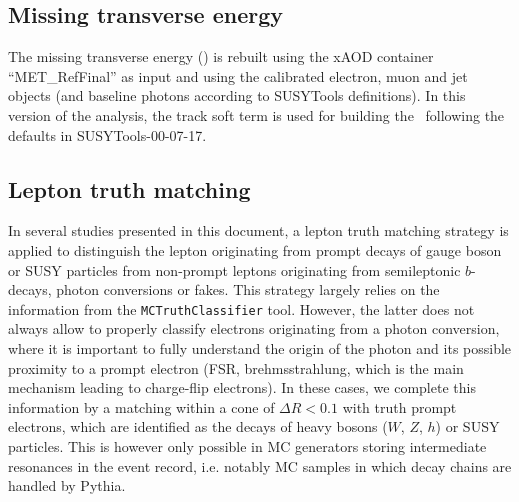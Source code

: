 \subsection{Missing transverse energy}
\label{sec:objects_met}

The missing transverse energy (\met) is rebuilt using the xAOD container ``MET\_RefFinal'' as input and using the calibrated electron, muon and jet objects 
(and baseline photons according to SUSYTools definitions). 
In this version of the analysis, the track soft term is used for building the \met\ following the defaults in SUSYTools-00-07-17.


\subsection{Lepton truth matching}
\label{sec:truth_matching}

In several studies presented in this document, 
a lepton truth matching strategy is applied to distinguish the lepton originating from prompt decays of gauge boson or SUSY particles 
from non-prompt leptons originating from semileptonic $b$-decays, photon conversions or fakes. 
This strategy largely relies on the information from the {\tt MCTruthClassifier} tool. 
However, the latter does not always allow to properly classify electrons originating from a photon conversion, 
where it is important to fully understand the origin of the photon and its possible proximity to a prompt electron 
(FSR, brehmsstrahlung, which is the main mechanism leading to charge-flip electrons). 
In these cases, we complete this information by a matching within a cone of $\Delta R <0.1$ with truth prompt electrons, 
which are identified as the decays of heavy bosons ($W$, $Z$, $h$) or SUSY particles. 
This is however only possible in MC generators storing intermediate resonances in the event record, 
i.e. notably MC samples in which decay chains are handled by Pythia. 

\FloatBarrier

